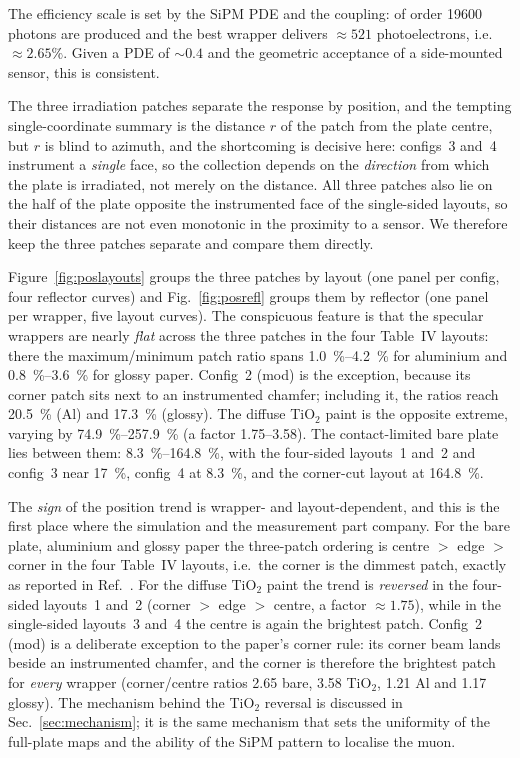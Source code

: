 \documentclass[11pt,a4paper]{article}
\begin{document}
The efficiency scale is set by the SiPM PDE and the coupling: of order
\num{19600} photons are produced and the best wrapper delivers
$\approx 521$ photoelectrons, i.e.\ $\approx 2.65\%$. Given a PDE of
$\sim\!0.4$ and the geometric acceptance of a side-mounted sensor, this is
consistent.

The three irradiation patches separate the response by position, and the
tempting single-coordinate summary is the distance $r$ of the patch
from the plate centre, but $r$ is blind to azimuth, and the shortcoming is
decisive here: configs~3 and~4 instrument a \emph{single} face, so the collection
depends on the \emph{direction} from which the plate is irradiated, not merely on
the distance. All three patches also lie on the half of the plate opposite the
instrumented face of the single-sided layouts, so their distances are not even
monotonic in the proximity to a sensor. We therefore keep the three patches
separate and compare them directly.

Figure~\ref{fig:poslayouts} groups the three patches by layout (one panel per
config, four reflector curves) and Fig.~\ref{fig:posrefl} groups them by
reflector (one panel per wrapper, five layout curves). The conspicuous feature
is that the specular wrappers are nearly \emph{flat} across the three patches
in the four Table~IV layouts: there the maximum/minimum patch ratio spans
\SIrange{1.0}{4.2}{\percent} for aluminium and \SIrange{0.8}{3.6}{\percent} for
glossy paper. Config~2 (mod) is the exception, because its corner patch sits
next to an instrumented chamfer; including it, the ratios reach
\SI{20.5}{\percent} (Al) and \SI{17.3}{\percent} (glossy). The diffuse
TiO$_2$ paint is the opposite extreme, varying by
\SIrange{74.9}{257.9}{\percent} (a factor \num{1.75}--\num{3.58}). The
contact-limited bare plate lies between them:
\SIrange{8.3}{164.8}{\percent}, with the four-sided layouts~1 and~2 and
config~3 near \SI{17}{\percent}, config~4 at \SI{8.3}{\percent}, and the
corner-cut layout at \SI{164.8}{\percent}.

The \emph{sign} of the position trend is wrapper- and layout-dependent, and
this is the first place where the simulation and the measurement part company.
For the bare plate, aluminium and glossy paper the three-patch ordering is
centre $>$ edge $>$ corner in the four Table~IV layouts, i.e.\ the corner is
the dimmest patch, exactly as reported in Ref.~\cite{Rao2025}. For the diffuse
TiO$_2$ paint the trend is \emph{reversed} in the four-sided layouts~1 and~2
(corner $>$ edge $>$ centre, a factor $\approx\!\num{1.75}$), while in the
single-sided layouts~3 and~4 the centre is again the brightest patch.
Config~2 (mod) is a deliberate exception to the paper's corner rule: its
corner beam lands beside an instrumented chamfer, and the corner is therefore
the brightest patch for \emph{every} wrapper (corner/centre ratios
\num{2.65} bare, \num{3.58} TiO$_2$, \num{1.21} Al and \num{1.17} glossy).
The mechanism behind the TiO$_2$ reversal is discussed in
Sec.~\ref{sec:mechanism}; it is
the same mechanism that sets the uniformity of the full-plate maps and the
ability of the SiPM pattern to localise the muon.
\end{document}
